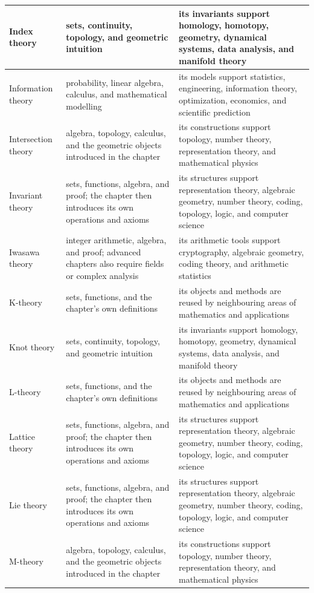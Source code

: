 \documentclass[11pt,oneside]{book}
\begin{document}
\begin{longtable}{>{\raggedright\arraybackslash}p{}>{\raggedright\arraybackslash}p{}>{\raggedright\arraybackslash}p{}}
\hline
Index theory & sets, continuity, topology, and geometric intuition & its invariants support homology, homotopy, geometry, dynamical systems, data analysis, and manifold theory\\
\hline
Information theory & probability, linear algebra, calculus, and mathematical modelling & its models support statistics, engineering, information theory, optimization, economics, and scientific prediction\\
\hline
Intersection theory & algebra, topology, calculus, and the geometric objects introduced in the chapter & its constructions support topology, number theory, representation theory, and mathematical physics\\
\hline
Invariant theory & sets, functions, algebra, and proof; the chapter then introduces its own operations and axioms & its structures support representation theory, algebraic geometry, number theory, coding, topology, logic, and computer science\\
\hline
Iwasawa theory & integer arithmetic, algebra, and proof; advanced chapters also require fields or complex analysis & its arithmetic tools support cryptography, algebraic geometry, coding theory, and arithmetic statistics\\
\hline
K-theory & sets, functions, and the chapter's own definitions & its objects and methods are reused by neighbouring areas of mathematics and applications\\
\hline
Knot theory & sets, continuity, topology, and geometric intuition & its invariants support homology, homotopy, geometry, dynamical systems, data analysis, and manifold theory\\
\hline
L-theory & sets, functions, and the chapter's own definitions & its objects and methods are reused by neighbouring areas of mathematics and applications\\
\hline
Lattice theory & sets, functions, algebra, and proof; the chapter then introduces its own operations and axioms & its structures support representation theory, algebraic geometry, number theory, coding, topology, logic, and computer science\\
\hline
Lie theory & sets, functions, algebra, and proof; the chapter then introduces its own operations and axioms & its structures support representation theory, algebraic geometry, number theory, coding, topology, logic, and computer science\\
\hline
M-theory & algebra, topology, calculus, and the geometric objects introduced in the chapter & its constructions support topology, number theory, representation theory, and mathematical physics\\

\end{longtable}
\end{document}
